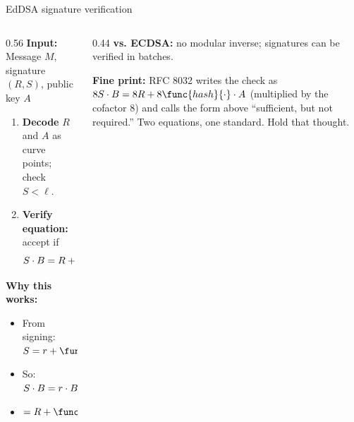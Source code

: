 \ifdefined\PRESENTATION\else\PassOptionsToClass{handout}{beamer}\fi\documentclass[aspectratio=169, lualatex]{beamer}
\begin{document}
\begin{frame}{EdDSA signature verification}
	\begin{columns}
		\begin{column}{0.56\textwidth}
			\textbf{Input:} Message $M$, signature $(R, S)$, public key $A$
			\begin{enumerate}
				\item \textbf{Decode} $R$ and $A$ as curve points; check $S < \ell$.
				\item \textbf{Verify equation:} accept if
				      $$S \cdot B = R + \func{hash}{R \parallel A \parallel M} \cdot A$$
			\end{enumerate}
			\textbf{Why this works:}
			\begin{itemize}
				\item From signing: $S = r + \func{hash}{R \parallel A \parallel M} \cdot a$
				\item So: $S \cdot B = r \cdot B + \func{hash}{R \parallel A \parallel M} \cdot a \cdot B$
				\item $= R + \func{hash}{R \parallel A \parallel M} \cdot A$
			\end{itemize}
		\end{column}
		\begin{column}{0.44\textwidth}
			\textbf{vs. ECDSA:} no modular inverse; signatures can be verified in batches.
			\vspace{0.3cm}

			\textbf{Fine print:} RFC 8032 writes the check as $8S \cdot B = 8R + 8\func{hash}{\cdot} \cdot A$ (multiplied by the cofactor 8) and calls the form above ``sufficient, but not required.'' Two equations, one standard. Hold that thought.
		\end{column}
	\end{columns}
\end{frame}
\end{document}
